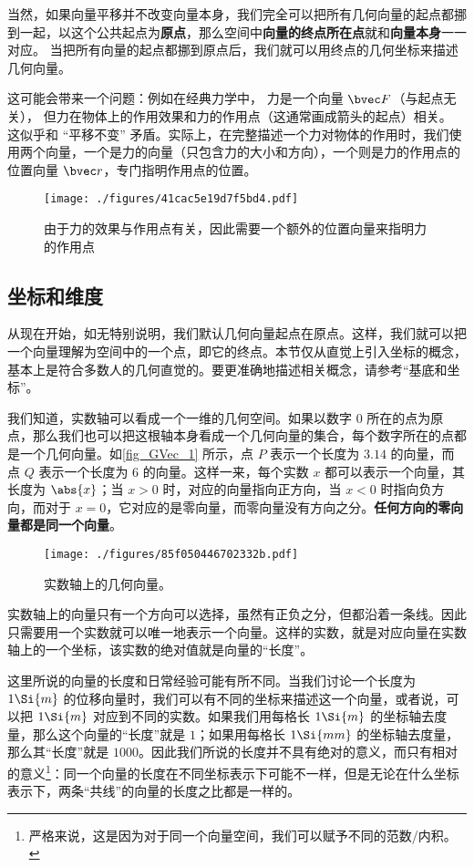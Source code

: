 当然，如果向量平移并不改变向量本身，我们完全可以把所有几何向量的起点都挪到一起，以这个公共起点为\textbf{原点}，那么空间中\textbf{向量的终点所在点}就和\textbf{向量本身}一一对应。 当把所有向量的起点都挪到原点后，我们就可以用终点的几何坐标来描述几何向量。

这可能会带来一个问题：例如在经典力学中， 力是一个向量 $\bvec F$（与起点无关）， 但力在物体上的作用效果和力的作用点（这通常画成箭头的起点）相关。 这似乎和 “平移不变” 矛盾。实际上，在完整描述一个力对物体的作用时，我们使用两个向量，一个是力的向量（只包含力的大小和方向），一个则是力的作用点的位置向量 $\bvec r$，专门指明作用点的位置。
\begin{figure}[ht]
\centering
\texttt{[image: ./figures/41cac5e19d7f5bd4.pdf]}
\caption{由于力的效果与作用点有关，因此需要一个额外的位置向量来指明力的作用点} \label{fig_GVec_5}
\end{figure}

\subsection{坐标和维度}
从现在开始，如无特别说明，我们默认几何向量起点在原点。这样，我们就可以把一个向量理解为空间中的一个点，即它的终点。本节仅从直觉上引入坐标的概念，基本上是符合多数人的几何直觉的。要更准确地描述相关概念，请参考“基底和坐标”。

我们知道，实数轴可以看成一个一维的几何空间。如果以数字 $0$ 所在的点为原点，那么我们也可以把这根轴本身看成一个几何向量的集合，每个数字所在的点都是一个几何向量。如\autoref{fig_GVec_1} 所示，点 $P$ 表示一个长度为 $3.14$ 的向量，而点 $Q$ 表示一个长度为 $6$ 的向量。这样一来，每个实数 $x$ 都可以表示一个向量，其长度为 $\abs{x}$；当 $x>0$ 时，对应的向量指向正方向，当 $x<0$ 时指向负方向，而对于 $x=0$，它对应的是零向量，而零向量没有方向之分。\textbf{任何方向的零向量都是同一个向量}。

\begin{figure}[ht]
\centering
\texttt{[image: ./figures/85f050446702332b.pdf]}
\caption{实数轴上的几何向量。} \label{fig_GVec_1}
\end{figure}

实数轴上的向量只有一个方向可以选择，虽然有正负之分，但都沿着一条线。因此只需要用一个实数就可以唯一地表示一个向量。这样的实数，就是对应向量在实数轴上的一个坐标，该实数的绝对值就是向量的“长度”。


这里所说的向量的长度和日常经验可能有所不同。当我们讨论一个长度为 $1\Si{m}$ 的位移向量时，我们可以有不同的坐标来描述这一个向量，或者说，可以把 $1\Si{m}$ 对应到不同的实数。如果我们用每格长 $1\Si{m}$ 的坐标轴去度量，那么这个向量的“长度”就是 $1$；如果用每格长 $1\Si{mm}$ 的坐标轴去度量，那么其“长度”就是 $1000$。因此我们所说的长度并不具有绝对的意义，而只有相对的意义\footnote{严格来说，这是因为对于同一个向量空间，我们可以赋予不同的范数/内积。}：同一个向量的长度在不同坐标表示下可能不一样，但是无论在什么坐标表示下，两条“共线”的向量的长度之比都是一样的。


